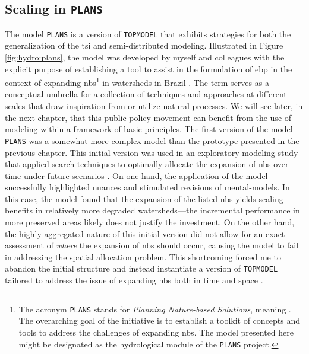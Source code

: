 \documentclass[./main_en.tex]{subfiles}
\begin{document}
\subsection{Scaling in \texttt{PLANS}} \label{sec:hydro:plans}

\par The \gls{model} \texttt{PLANS} is a version of \texttt{TOPMODEL} that exhibits strategies for both the generalization of the \gls{tsi} and semi-distributed modeling. Illustrated in Figure \ref{fig:hydro:plans}, the \gls{model} was developed by myself and colleagues with the explicit purpose of establishing a tool to assist in the formulation of \gls{ebp} in the context of expanding \acrfull{nbs}\footnote{The acronym \texttt{PLANS} stands for \textit{Planning Nature-based Solutions}, meaning . The overarching goal of the initiative is to establish a toolkit of concepts and tools to address the challenges of expanding \acrshort{nbs}. The \gls{model} presented here might be designated as the hydrological module of the \texttt{PLANS} project.} in watersheds in Brazil \cite{Possantti2022a, Possantti2023a}. The term  serves as a conceptual umbrella for a collection of techniques and approaches at different scales that draw inspiration from or utilize natural processes. We will see later, in the next chapter, that this public policy movement can benefit from the use of modeling within a framework of basic principles. The first version of the \gls{model} \texttt{PLANS} was a somewhat more complex \gls{model} than the prototype presented in the previous chapter. This initial version was used in an exploratory modeling study that applied search techniques to optimally allocate the expansion of \acrshort{nbs} over time under future scenarios \cite{Possantti2022a}. On one hand, the application of the \gls{model} successfully highlighted nuances and stimulated revisions of \gls{mental-models}. In this case, the \gls{model} found that the expansion of the listed \acrshort{nbs} yields scaling benefits in relatively more degraded watersheds—the incremental performance in more preserved areas likely does not justify the investment. On the other hand, the highly aggregated nature of this initial version did not allow for an exact assessment of \textit{where} the expansion of \acrshort{nbs} should occur, causing the \gls{model} to fail in addressing the spatial allocation problem. This shortcoming forced me to abandon the initial structure and instead instantiate a version of \texttt{TOPMODEL} tailored to address the issue of expanding \acrshort{nbs} both in time and space \cite{Possantti2023a}.
\end{document}
